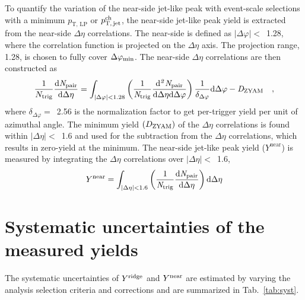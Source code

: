 To quantify the variation of the near-side jet-like peak with event-scale selections with a minimum $p_\mathrm{T,\,LP}$ or $p_\mathrm{T,\,jet}^\mathrm{ch}$, the near-side jet-like peak yield is extracted from the near-side $\Delta\eta$ correlations. The near-side is defined as $|\Delta\varphi|<$~1.28, where the correlation function is projected on the $\Delta\eta$ axis. The projection range, 1.28, is chosen to fully cover $\Delta\varphi_{\rm{min}}$. The near-side $\Delta\eta$ correlations are then constructed as
\begin{eqnarray}
\frac{1}{N_{\rm{trig}}} \frac{ \rm{d}\it{}N_{\rm{pair}} }{ \rm{d}\Delta\eta } = \int_{|\Delta \varphi|<1.28} \left( \frac{1}{\it{N}_{\rm{trig}}} \frac{ \rm{d}\it{}^{2} N_{\rm{pair}} }{ \rm{d}\Delta\eta d\Delta\varphi} \right) \dfrac{1}{\delta_{\Delta\varphi}} \rm{d} \Delta \varphi - \it{D}_{\rm{ZYAM}} \quad,
\end{eqnarray}
where $\delta_{\Delta\varphi}=$~2.56 is the normalization factor to get per-trigger yield per unit of azimuthal angle.
The minimum yield $(D_{\rm{ZYAM}})$ of the $\Delta\eta$ correlations is found within $|\Delta\eta|<$~1.6 and used for the subtraction from  the $\Delta\eta$ correlations, which results in zero-yield at the minimum. The near-side jet-like peak yield ($Y^{\mathrm{near}}$) is measured by integrating the $\Delta\eta$ correlations over $|\Delta\eta|<$~1.6,
\begin{eqnarray}
Y^{\rm{near}} = \int_{|\Delta \eta|<1.6} \left( \frac{1}{\it{N}_{\rm{trig}}} \frac{ \rm{d}\it{}N_{\rm{pair}} }{ \rm{d}\Delta\eta } \right) \rm{d} \Delta\eta
\end{eqnarray}

\section{Systematic uncertainties of the measured yields}
\label{sec:uncertainties}

The systematic uncertainties of $Y^{\rm{ridge}}$ and $Y^{\rm{near}}$ are estimated by varying the analysis selection criteria and corrections and are summarized in Tab.~\ref{tab:syst}.

